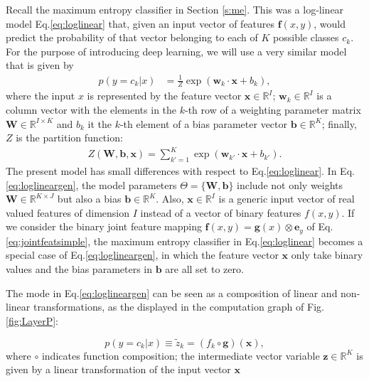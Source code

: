Recall the maximum entropy classifier in Section \ref{s:me}. This was a log-linear model Eq.\ref{eq:loglinear} that, given an input vector of features $\boldsymbol{f}(x,y)$, would
predict the probability of that vector belonging to each of $K$ possible
classes $c_k$. %
 For the purpose of introducing deep learning, 
 we will use a very similar model that is given by
%
\begin{align}
p(y=c_k|{x}) & = \frac{1}{Z}\exp(\mathbf{w}_k \cdot \mathbf{x} + b_k),
\label{eq:loglineargen}
\end{align}
%
%
where the input $x$ is represented by the feature vector $\mathbf{x} \in \mathbb{R}^{I}$; $\mathbf{w}_k \in \mathbb{R}^{I}$ is a column vector with the elements in the $k$-{th} row of a weighting parameter matrix $\textbf{W} \in \mathbb{R}^{I \times K}$ and $b_k$ it the $k$-th element of a bias parameter vector $\textbf{b} \in \mathbb{R}^{K}$; finally, $Z$ is the partition function:
\begin{align}
Z(\mathbf{W},\mathbf{b},\mathbf{x}) = \sum_{k'=1}^{K} \exp(\mathbf{w}_{k'} \cdot \mathbf{x} + b_{k'}). 
\label{eq:loglineargenPartition}
\end{align}
%
The present model has small differences with respect to  Eq.\ref{eq:loglinear}. In Eq.\ref{eq:loglineargen}, the model
parameters $\Theta=\{\mathbf{W}, \mathbf{b}\}$ include not only weights $\mathbf{W} \in \mathbb{R}^{K \times J}$ but also a bias $\mathbf{b} \in
\mathbb{R}^{K}$. Also, $\mathbf{x} \in \mathbb{R}^{I}$ is a
generic input vector of real valued features of dimension $I$ instead of a vector of binary features $f(x,y)$. If we consider the binary
joint feature mapping $\boldsymbol{f}(x,y) = \boldsymbol{g}(x) \otimes \boldsymbol{e}_y\nonumber$ of Eq.\ref{eq:jointfeatsimple}, the maximum entropy classifier in Eq.\ref{eq:loglinear}
becomes a special case of Eq.\ref{eq:loglineargen}, in which the feature vector $\mathbf{x}$ only take binary values and the bias parameters in $\mathbf{b}$ are all set to zero.

The mode in  Eq.\ref{eq:loglineargen} can be seen as a composition of
linear and non-linear transformations, as the displayed in the computation graph of Fig.\ref{fig:LayerP}:

\begin{equation}
p(y=c_k|{x}) \equiv \tilde{z}_k = (f_k \circ \mathbf{g})(\mathbf{x}),
\end{equation}
%
where $\circ$ indicates function composition; the intermediate vector variable $\mathbf{z} \in \mathbb{R}^{K}$ is given by a linear transformation of the input vector $\mathbf{x}$

